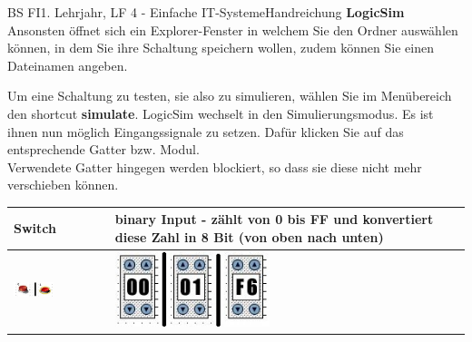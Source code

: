 \documentclass[11pt,oneside,openany,headings=optiontotoc,11pt,numbers=noenddot]{article}
\begin{document}
\begin{worksheet}{BS FI}{1. Lehrjahr, LF 4 - Einfache IT-Systeme}{Handreichung \textbf{LogicSim}}
		\noindent
		Ansonsten öffnet sich ein Explorer-Fenster in welchem Sie den Ordner auswählen können, in dem Sie ihre Schaltung speichern wollen, zudem können Sie einen Dateinamen angeben.\\
		\par\noindent
		Um eine Schaltung zu testen, sie also zu simulieren, wählen Sie im Menübereich den shortcut \textbf{simulate}. LogicSim wechselt in den Simulierungsmodus. Es ist ihnen nun möglich Eingangssignale zu setzen. Dafür klicken Sie auf das entsprechende Gatter bzw. Modul.\\
		Verwendete Gatter hingegen werden blockiert, so dass sie diese nicht mehr verschieben können.\\
		\par\noindent
		\begin{tabularx}{\textwidth}{M|M}
			\textbf{Switch} & \textbf{binary Input} - zählt von 0 bis FF und konvertiert diese Zahl in 8 Bit (von oben nach unten)\\
			\hline
			\hline
			\includegraphics[width=0.45\textwidth,align=t]{../99_Bilder/switch.jpg} & \includegraphics[width=0.45\textwidth,align=t]{../99_Bilder/binIn.jpg}
		\end{tabularx}
	\end{worksheet}
\end{document}
